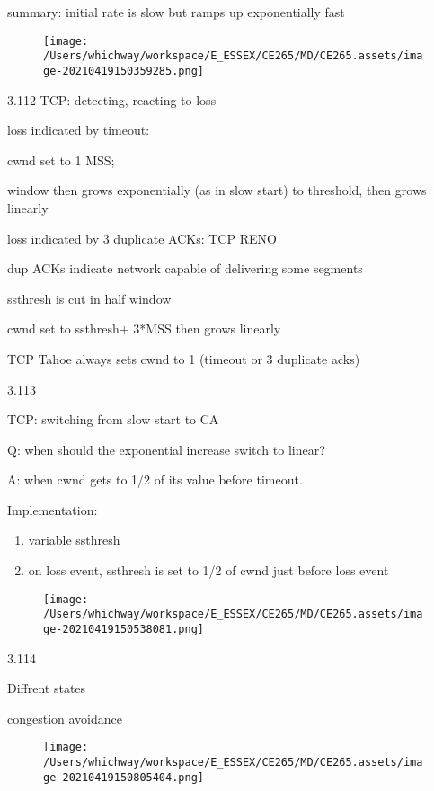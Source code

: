 \documentclass[
]{article}
\begin{document}
summary: initial rate is slow but ramps up exponentially fast

\begin{figure}
\centering
\texttt{[image: /Users/whichway/workspace/E\_ESSEX/CE265/MD/CE265.assets/image-20210419150359285.png]}
\caption{}
\end{figure}

3.112 TCP: detecting, reacting to loss

\begin{quote}
\end{quote}

loss indicated by timeout:

cwnd set to 1 MSS;

window then grows exponentially (as in slow start) to threshold, then
grows linearly

loss indicated by 3 duplicate ACKs: TCP RENO

dup ACKs indicate network capable of delivering some segments

ssthresh is cut in half window

cwnd set to ssthresh+ 3*MSS then grows linearly

TCP Tahoe always sets cwnd to 1 (timeout or 3 duplicate acks)

3.113

TCP: switching from slow start to CA

Q: when should the exponential increase switch to linear?

A: when cwnd gets to 1/2 of its value before timeout.

Implementation:

\begin{enumerate}
\def\labelenumi{\arabic{enumi}.}
\item
  variable ssthresh
\item
  on loss event, ssthresh is set to 1/2 of cwnd just before loss event
\end{enumerate}

\begin{figure}
\centering
\texttt{[image: /Users/whichway/workspace/E\_ESSEX/CE265/MD/CE265.assets/image-20210419150538081.png]}
\caption{}
\end{figure}

3.114

Diffrent states

congestion avoidance

\begin{figure}
\centering
\texttt{[image: /Users/whichway/workspace/E\_ESSEX/CE265/MD/CE265.assets/image-20210419150805404.png]}
\caption{}
\end{figure}
\end{document}
